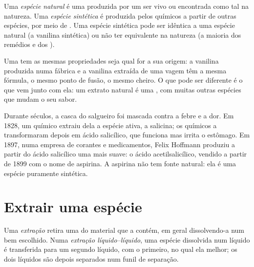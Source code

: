 \begin{definition}\label{def:g10:chemical-species:natural}
Uma \emph{espécie natural} é uma 
produzida por um ser vivo ou encontrada como tal na natureza. Uma
\emph{espécie sintética} é produzida pelos
químicos a partir de outras espécies, por meio de . Uma
espécie sintética pode ser idêntica a uma espécie natural (a vanilina
sintética) ou não ter equivalente na natureza (a maioria dos remédios e
dos ).
\end{definition}

\begin{proposition}\label{prop:g10:chemical-species:same}
Uma  tem as mesmas propriedades seja qual for a sua
origem: a vanilina produzida numa fábrica e a vanilina extraída de uma
vagem têm a mesma fórmula, o mesmo ponto de fusão, o mesmo cheiro. O que
pode ser diferente é o que vem junto com ela: um extrato natural é uma
, com muitas outras espécies que mudam o seu sabor.
\end{proposition}

\begin{history}
Durante séculos, a casca do salgueiro foi mascada contra a febre e a dor.
Em 1828, um químico extraiu dela a espécie ativa, a salicina; os
químicos a transformaram depois em ácido salicílico, que funciona mas
irrita o estômago. Em 1897, numa empresa de corantes e medicamentos,
Felix Hoffmann produziu a partir do ácido salicílico uma  mais suave: o ácido acetilsalicílico, vendido a partir de 1899
com o nome de aspirina. A aspirina não tem fonte natural: ela é uma
espécie puramente sintética.
\end{history}

\section{Extrair uma espécie}

\begin{definition}\label{def:g10:chemical-species:extraction}
Uma \emph{extração} retira uma  do
material que a contém, em geral dissolvendo-a num  bem
escolhido. Numa \emph{extração líquido--líquido},
uma espécie dissolvida num líquido é transferida para um segundo líquido,  com o primeiro, no qual ela 
melhor; os dois líquidos são depois separados num funil de separação.
\end{definition}

